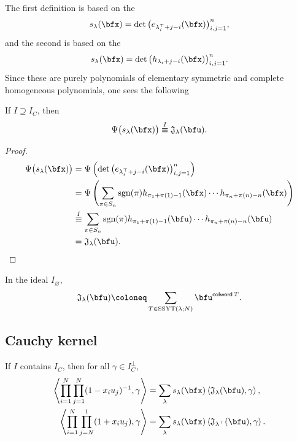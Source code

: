 \documentclass{article}
\newcommand{\ip}[1]{
    \left\langle
        {#1}
    \right\rangle
}
\newcommand*\colword{\operatorname{\mathsf{colword}}}
\newcommand*\frkJ{\mathfrak{J}}
\newcommand*\SSYT{\operatorname{SSYT}}
\newcommand*\sgn{\operatorname{sgn}}
\begin{document}
The first definition is based on the 
\[
    s_\lambda(\bfx)
    =
    \det\big(e_{\lambda^\top_i+j-i}(\bfx)\big)_{i,j=1}^n,
\]
and the second is based on the 
\[
    s_\lambda(\bfx)
    =
    \det\big(h_{\lambda_i+j-i}(\bfx)\big)_{i,j=1}^n.
\]
Since these are purely polynomials of elementary symmetric and complete homogeneous polynomials, one sees the following
\begin{definition}
    If $I \supseteq I_C$, then
    \[
        \Psi\big(s_\lambda(\bfx)\big)
        \overset{I}{\equiv}
        \frkJ_\lambda(\bfu).
    \]
\end{definition}
\begin{proof}
    \begin{align*}
        \Psi\big(s_\lambda(\bfx)\big)
        &=
        \Psi \left(
            \det\big(e_{\lambda^\top_i+j-i}(\bfx)\big)_{i,j=1}^n
        \right)
        \\
        &=
        \Psi \left(
            \sum_{\pi \in S_n}
            \sgn(\pi)
            h_{\pi_1+\pi(1)-1}(\bfx)
            \cdots
            h_{\pi_n+\pi(n)-n}(\bfx)
        \right)
        \\
        &\overset{I}{\equiv}
        \sum_{\pi \in S_n}
        \sgn(\pi)
        h_{\pi_1+\pi(1)-1}(\bfu)
        \cdots
        h_{\pi_n+\pi(n)-n}(\bfu)
        \\
        &=
        \frkJ_\lambda(\bfu).
    \end{align*}
\end{proof}

\begin{theorem}
    In the ideal $I_\varnothing$,
    \[
        \frkJ_\lambda(\bfu)
        \coloneq
        \sum_{T \in \SSYT(\lambda;N)}
        \bfu^{\colword T}.
    \]
\end{theorem}

\subsection{Cauchy kernel}

\begin{theorem}
    If $I$ contains $I_C$, then for all $\gamma \in I_C^\perp$,
    \begin{align}
        \ip{
            \prod_{i=1}^N
            \prod_{j=1}^N
            (1 - x_iu_j)^{-1},
            \gamma
        }
        &=
        \sum_\lambda
        s_\lambda(\bfx)
        \ip{
        \frkJ_\lambda(\bfu),\gamma
        },
        \\
        \ip{
            \prod_{i=1}^N
            \prod_{j=N}^1
            (1 + x_iu_j),
            \gamma
        }
        &=
        \sum_\lambda
        s_\lambda(\bfx)
        \ip{
        \frkJ_{\lambda^\top}(\bfu),\gamma
        }.
    \end{align}
\end{theorem}
\end{document}
